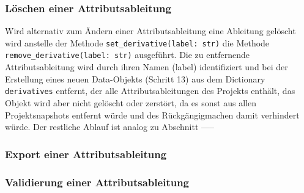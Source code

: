 \documentclass{article}
\begin{document}
\subsubsection{Löschen einer Attributsableitung}
Wird alternativ zum Ändern einer Attributsableitung eine Ableitung gelöscht wird anstelle der Methode \texttt{set\_derivative(label: str)} die Methode \texttt{remove\_derivative(label: str)} ausgeführt. Die zu entfernende Attributsableitung wird durch ihren Namen (label) identifiziert und bei der Erstellung eines neuen Data-Objekts (Schritt 13) aus dem Dictionary \texttt{derivatives} entfernt, der alle Attributsableitungen des Projekts enthält, das Objekt wird aber nicht gelöscht oder zerstört, da es sonst aus allen Projektsnapshots entfernt würde und des Rückgängigmachen damit verhindert würde. Der restliche Ablauf ist analog zu Abschnitt -----

\subsubsection{Export einer Attributsableitung}



\subsubsection{Validierung einer Attributsableitung}
\end{document}
